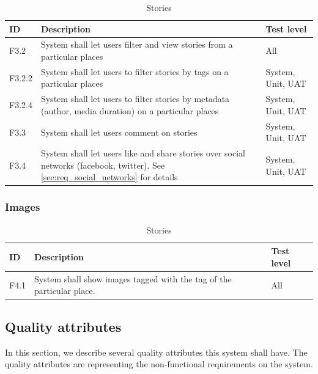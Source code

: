 \documentclass[11pt]{book}
\begin{document}
\begin{table}[H]
\centering
\begin{tabular}{ l  p{11cm} l }
    ID       & Description                                                                                              & Test level            \\ \hline
    F3.2     & System shall let users filter and view stories from a particular places                                  & All                   \\ \hline
    F3.2.2   & System shall let users to filter stories by tags on a particular places                                  & System, Unit, UAT     \\ \hline
    F3.2.4   & System shall let users to filter stories by metadata (author, media duration) on a particular places     & System, Unit, UAT     \\ \hline
    F3.3     & System shall let users comment on stories                                                                & System, Unit, UAT     \\ \hline
    F3.4     & System shall let users like and share stories over social networks (facebook, twitter). 
               See \ref{sec:req_social_networks} for details                                                            & System, Unit, UAT     \\
    \end{tabular}
\caption{Stories}
\label{tab:req_stories}
\end{table}

\subsubsection{Images}

\begin{table}[H]
\centering
\begin{tabular}{ l  p{11cm} l }
    ID       & Description                                                                                              & Test level            \\ \hline
    F4.1     & System shall show images tagged with the tag of the particular place.                                    & All                   \\
    \end{tabular}
\caption{Stories}
\label{tab:req_images}
\end{table}

\subsection{Quality attributes}\label{sec:req_software_system_attributes}
In this section, we describe several quality attributes this system shall have. The quality attributes are representing the non-functional requirements on the system.
\end{document}
